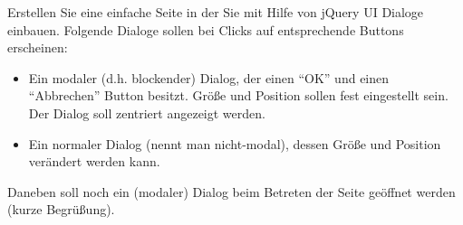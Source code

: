 %
\par Erstellen Sie eine einfache Seite in der Sie mit Hilfe von jQuery UI Dialoge einbauen. Folgende Dialoge sollen bei Clicks auf entsprechende Buttons erscheinen:
%
\begin{itemize}
\item Ein modaler (d.h. blockender) Dialog, der einen ``OK'' und einen ``Abbrechen'' Button besitzt. Größe und Position sollen fest eingestellt sein. Der Dialog soll zentriert angezeigt werden.
\item Ein normaler Dialog (nennt man nicht-modal), dessen Größe und Position verändert werden kann.
\end{itemize}
%
\par Daneben soll noch ein (modaler) Dialog beim Betreten der Seite geöffnet werden (kurze Begrüßung).